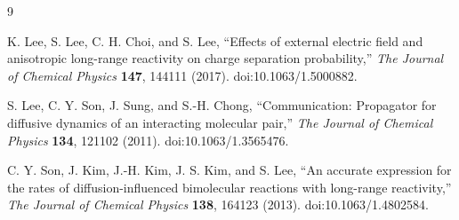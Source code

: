 \documentclass[11pt,a4paper]{article}
\begin{document}
\begin{thebibliography}{9}

K. Lee, S. Lee, C. H. Choi, and S. Lee,
``Effects of external electric field and anisotropic long-range reactivity on charge separation probability,''
\textit{The Journal of Chemical Physics} \textbf{147}, 144111 (2017).
doi:10.1063/1.5000882.

S. Lee, C. Y. Son, J. Sung, and S.-H. Chong,
``Communication: Propagator for diffusive dynamics of an interacting molecular pair,''
\textit{The Journal of Chemical Physics} \textbf{134}, 121102 (2011).
doi:10.1063/1.3565476.

C. Y. Son, J. Kim, J.-H. Kim, J. S. Kim, and S. Lee,
``An accurate expression for the rates of diffusion-influenced bimolecular reactions with long-range reactivity,''
\textit{The Journal of Chemical Physics} \textbf{138}, 164123 (2013).
doi:10.1063/1.4802584.

\end{thebibliography}
\end{document}
